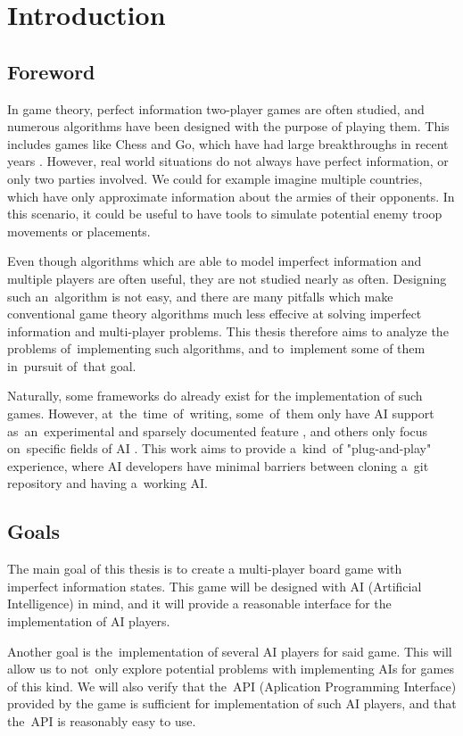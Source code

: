 \chapter*{Introduction}

\section*{Foreword}

In game theory, perfect information two-player games are often
studied, and numerous algorithms have been designed with the purpose
of playing them. This includes games like Chess and Go, which have had
large breakthroughs in recent years \cite{Silver16}. However, real world
situations do not always have perfect information, or only two parties involved.
We could for example imagine multiple countries, which have only approximate
information about the armies of their opponents. In this scenario, it could be
useful to have tools to simulate potential enemy troop movements or placements.

Even though algorithms which are able to model imperfect information and multiple
players are often useful, they are not studied nearly as often. Designing such
an~algorithm is not easy, and there are many pitfalls which make conventional
game theory algorithms much less effecive at solving imperfect information and
multi-player problems. This thesis therefore aims to analyze the problems
of~implementing such algorithms, and to~implement some of them in~pursuit of~that goal.

Naturally, some frameworks do already exist for the implementation of such games.
However, at~the~time~of~writing, some~of~them only have AI support as~an~experimental
and sparsely documented feature \cite{Boardgameio}, and others only focus
on~specific fields of AI \cite{Openaigym}. This work aims to provide a~kind~of
"plug-and-play" experience, where AI developers have minimal barriers between
cloning a~git repository and having a~working AI.

\section*{Goals}

The main goal of this thesis is to create a multi-player board game with
imperfect information states. This game will be designed with AI (Artificial
Intelligence) in mind, and it will provide a reasonable interface for
the implementation of AI players.

Another goal is the~implementation of several AI players for said game. This will
allow us to not~only explore potential problems with implementing AIs for games
of this kind. We will also verify that the~API (Aplication Programming Interface)
provided by the game is sufficient for implementation of such AI players, and that
the~API is reasonably easy to use.
